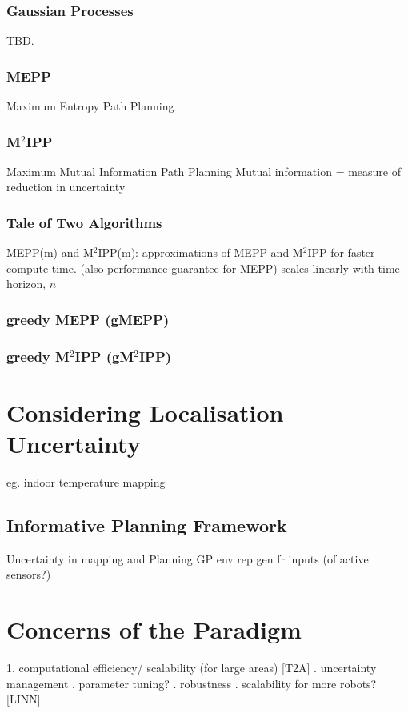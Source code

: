 \documentclass{article}
\begin{document}
   \subsubsection{Gaussian Processes}
   TBD.
   \subsubsection{MEPP}
   Maximum Entropy Path Planning
   \subsubsection{M$^2$IPP}
   Maximum Mutual Information Path Planning
   Mutual information = measure of reduction in uncertainty
   \subsubsection{Tale of Two Algorithms}
   MEPP(m) and M$^2$IPP(m): approximations of MEPP and M$^2$IPP for faster compute time. (also performance guarantee for MEPP)
   scales linearly with time horizon, $n$
   \subsubsection{greedy MEPP (gMEPP)}

   \subsubsection{greedy M$^2$IPP (gM$^2$IPP)}

   \section{Considering Localisation Uncertainty}
   eg. indoor temperature mapping
   \subsection{Informative Planning Framework}
   Uncertainty in mapping and Planning
   GP env rep gen fr inputs (of active sensors?)




   \section{Concerns of the Paradigm}
   1. computational efficiency/ scalability (for large areas) [T2A] . uncertainty management . parameter tuning? . robustness . scalability for more robots? [LINN]



\clearpage
\printnoidxglossaries
\end{document}
